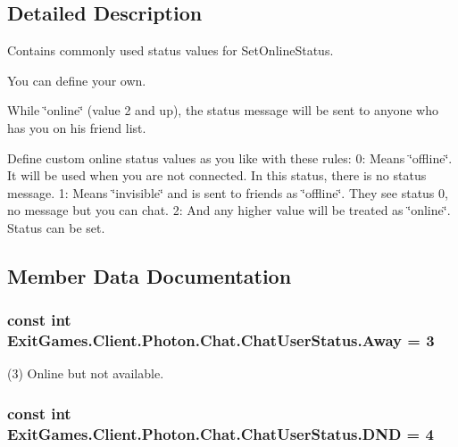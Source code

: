 \subsection{Detailed Description}
Contains commonly used status values for Set\+Online\+Status. 

You can define your own.

While \char`\"{}online\char`\"{} (value 2 and up), the status message will be sent to anyone who has you on his friend list.

Define custom online status values as you like with these rules\+: 0\+: Means \char`\"{}offline\char`\"{}. It will be used when you are not connected. In this status, there is no status message. 1\+: Means \char`\"{}invisible\char`\"{} and is sent to friends as \char`\"{}offline\char`\"{}. They see status 0, no message but you can chat. 2\+: And any higher value will be treated as \char`\"{}online\char`\"{}. Status can be set. 

\subsection{Member Data Documentation}
\subsubsection[{\texorpdfstring{Away}{Away}}]{\setlength{\rightskip}{0pt plus 5cm}const int Exit\+Games.\+Client.\+Photon.\+Chat.\+Chat\+User\+Status.\+Away = 3}\hypertarget{class_exit_games_1_1_client_1_1_photon_1_1_chat_1_1_chat_user_status_ac0d131911c02002db06c39f7bd03d3b7}{}\label{class_exit_games_1_1_client_1_1_photon_1_1_chat_1_1_chat_user_status_ac0d131911c02002db06c39f7bd03d3b7}


(3) Online but not available.

\subsubsection[{\texorpdfstring{D\+ND}{DND}}]{\setlength{\rightskip}{0pt plus 5cm}const int Exit\+Games.\+Client.\+Photon.\+Chat.\+Chat\+User\+Status.\+D\+ND = 4}\hypertarget{class_exit_games_1_1_client_1_1_photon_1_1_chat_1_1_chat_user_status_a428da57bdeeb644c8fbeb3b1f5fb53b5}{}\label{class_exit_games_1_1_client_1_1_photon_1_1_chat_1_1_chat_user_status_a428da57bdeeb644c8fbeb3b1f5fb53b5}


